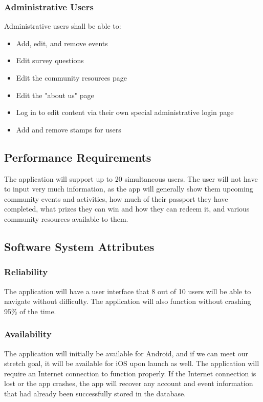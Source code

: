 \documentclass[draftclsnofoot, onecolumn, 10pt, compsoc]{IEEEtran}
\begin{document}
			\subsubsection{Administrative Users}
				Administrative users shall be able to:
				\begin{itemize}
					\item Add, edit, and remove events
					\item Edit survey questions
					\item Edit the community resources page
					\item Edit the "about us" page
					\item Log in to edit content via their own special administrative login page
					\item Add and remove stamps for users
				\end{itemize}
		
		\subsection{Performance Requirements}
			The application will support up to 20 simultaneous users. The user will not have to input very much information, as the app will generally show them upcoming community events and activities, how much of their passport they have completed, what prizes they can win and how they can redeem it, and various community resources available to them.
		
		\subsection{Software System Attributes}
			\subsubsection{Reliability}
				The application will have a user interface that 8 out of 10 users will be able to navigate without difficulty. The application will also function without crashing 95\% of the time.
			
			\subsubsection{Availability}
				The application will initially be available for Android, and if we can meet our stretch goal, it will be available for iOS upon launch as well. The application will require an Internet connection to function properly. If the Internet connection is lost or the app crashes, the app will recover any account and event information that had already been successfully stored in the database.
			
\end{document}
